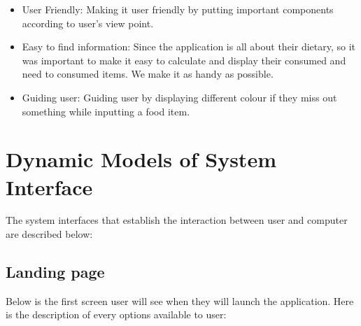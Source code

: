 \documentclass{scrreprt}
\begin{document}
\begin{itemize}
	\item User Friendly: Making it user friendly by putting important components according to user's view point.
	\item Easy to find information: Since the application is all about their dietary, so it was important to make it easy to calculate and display their consumed and need to consumed items. We make it as handy as possible.
	\item Guiding user: Guiding user by displaying different colour if they miss out something while inputting a food item.
\end{itemize}

\section{Dynamic Models of System Interface}
The system interfaces that establish the interaction between user and computer are described below:

\clearpage

\subsection{Landing page}
Below is the first screen user will see when they will launch the application. Here is the description of every options available to user:
\end{document}
